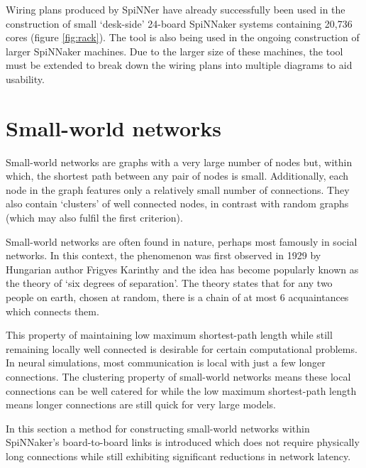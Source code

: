 			Wiring plans produced by SpiNNer have already successfully been used in
			the construction of small `desk-side' 24-board SpiNNaker systems
			containing 20,736 cores (figure \ref{fig:rack}). The tool is also being
			used in the ongoing construction of larger SpiNNaker machines. Due to the
			larger size of these machines, the tool must be extended to break down the
			wiring plans into multiple diagrams to aid usability.
	
	
	\section{Small-world networks}
		
		
		Small-world networks are graphs with a very large number of nodes but,
		within which, the shortest path between any pair of nodes is small.
		Additionally, each node in the graph features only a relatively small number
		of connections. They also contain `clusters' of well connected nodes, in
		contrast with random graphs (which may also fulfil the first criterion).
		
		Small-world networks are often found in nature, perhaps most famously in
		social networks. In this context, the phenomenon was first observed in 1929
		by Hungarian author Frigyes Karinthy \cite{karinthy29} and the idea has
		become popularly known as the theory of `six degrees of separation'. The
		theory states that for any two people on earth, chosen at random, there is a
		chain of at most 6 acquaintances which connects them.
		
		This property of maintaining low maximum shortest-path length while still
		remaining locally well connected is desirable for certain computational
		problems. In neural simulations, most communication is local with just a few
		longer connections. The clustering property of small-world networks means
		these local connections can be well catered for while the low maximum
		shortest-path length means longer connections are still quick for very large
		models.
		
		In this section a method for constructing small-world networks within
		SpiNNaker's board-to-board links is introduced which does not require
		physically long connections while still exhibiting significant reductions in
		network latency.
		

